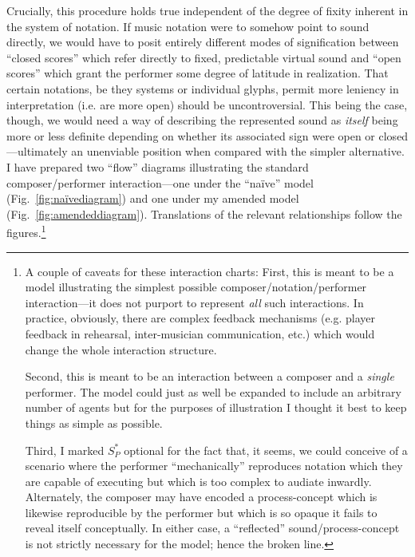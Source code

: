     Crucially, this procedure holds true independent of the degree of fixity inherent in the system of notation. If music notation were to somehow point to sound directly, we would have to posit entirely different modes of signification between ``closed scores'' which refer directly to fixed, predictable virtual sound and ``open scores'' which grant the performer some degree of latitude in realization. That certain notations, be they systems or individual glyphs, permit more leniency in interpretation (i.e. are more open) should be uncontroversial. This being the case, though, we would need a way of describing the represented sound as \textit{itself} being more or less definite depending on whether its associated sign were open or closed---ultimately an unenviable position when compared with the simpler alternative. I have prepared two ``flow'' diagrams illustrating the standard composer/performer interaction---one under the ``naïve'' model (Fig.~\ref{fig:naïvediagram}) and one under my amended model (Fig.~\ref{fig:amendeddiagram}). Translations of the relevant relationships follow the figures.\footnote{
        A couple of caveats for these interaction charts: First, this is meant to be a model illustrating the simplest possible composer/notation/performer interaction---it does not purport to represent \textit{all} such interactions. In practice, obviously, there are complex feedback mechanisms (e.g. player feedback in rehearsal, inter-musician communication, etc.) which would change the whole interaction structure. 
        
        Second, this is meant to be an interaction between a composer and a \textit{single} performer. The model could just as well be expanded to include an arbitrary number of agents but for the purposes of illustration I thought it best to keep things as simple as possible. 
        
        Third, I marked $S^*_P$ optional for the fact that, it seems, we could conceive of a scenario where the performer ``mechanically'' reproduces notation which they are capable of executing but which is too complex to audiate inwardly. Alternately, the composer may have encoded a process-concept which is likewise reproducible by the performer but which is so opaque it fails to reveal itself conceptually. In either case, a ``reflected'' sound/process-concept is not strictly necessary for the model; hence the broken line.
        
        } 


